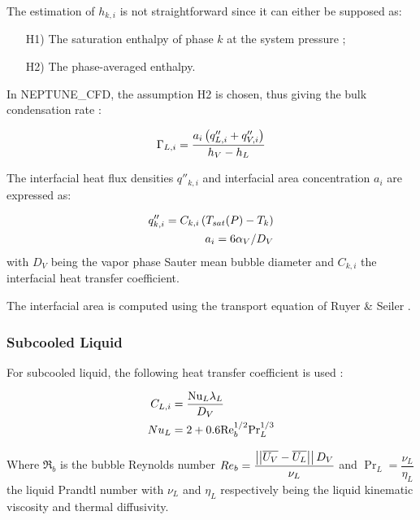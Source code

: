 The estimation of $h_{k,i}$ is not straightforward since it can either be supposed as:

\begin{enumerate}
\item[H1)] The saturation enthalpy of phase $k$ at the system pressure ;
\item[H2)] The phase-averaged enthalpy.
\end{enumerate}

\npar
In NEPTUNE\_CFD, the assumption H2 is chosen, thus giving the bulk condensation rate :

\begin{equation}
\Gamma_{L,i}=\frac{a_{i}\left( q''_{L,i}+q''_{V,i} \right)}{h_{V}-h_{L}}
\label{eq:ncfd_cond_rate}
\end{equation}


The interfacial heat flux densities $q''_{k,i}$ and interfacial area concentration $a_{i}$ are expressed as:

\begin{align}
q''_{k,i}=C_{k,i}\left( T_{sat}(P)-T_{k} \right)\\
a_{i}=6 \alpha_{V}/D_{V}
\end{align}
with $D_{V}$ being the vapor phase Sauter mean bubble diameter and $C_{k,i}$ the interfacial heat transfer coefficient.

\npar

\begin{note*}{}
The interfacial area is computed using the transport equation of {Ruyer} \& {Seiler} \cite{ruyer_modelisation_2009}.
\end{note*}


\subsubsection{Subcooled Liquid}

For subcooled liquid, the following heat transfer coefficient is used \cite{ranz_evaporation_1952, manon_contribution_2000}:

\begin{align}
C_{L,i}&=\frac{\Nu_{L}\lambda_{L}}{D_{V}}\\
%
Nu_{L}&=2+0.6\Re_{b}^{1/2}\Pr_{L}^{1/3}
\label{eq:ncfd_subcooled_L}
\end{align}

Where $\Re_{b}$ is the bubble Reynolds number $Re_{b}=\dfrac{\left|\left|{\overline{U_{V}}-\overline{U_{L}}}\right|\right|D_{V} }{\nu_{L}}$ and $\Pr_{L}=\dfrac{\nu_{L}}{\eta_{L}}$ the liquid Prandtl number with $\nu_{L}$ and $\eta_{L}$ respectively being the liquid kinematic viscosity and thermal diffusivity.


